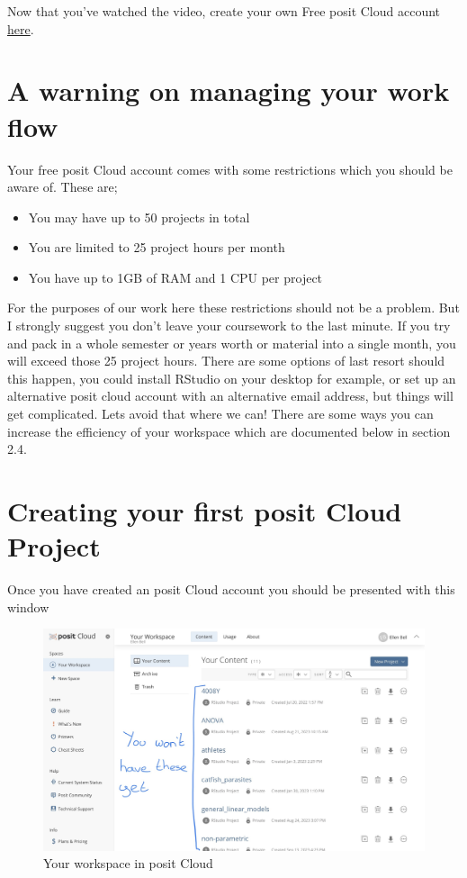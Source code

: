 \documentclass[
]{book}
\providecommand{\tightlist}{%
  \setlength{\itemsep}{0pt}\setlength{\parskip}{0pt}}
\begin{document}
Now that you've watched the video, create your own Free posit Cloud account \href{https://login.rstudio.cloud/login?redirect=\%2Foauth\%2Fauthorize\%3Fredirect_uri\%3Dhttps\%253A\%252F\%252Frstudio.cloud\%252Flogin\%26client_id\%3Drstudio-cloud\%26response_type\%3Dcode\%26show_auth\%3D0\%26show_login\%3D1}{here}.

\hypertarget{a-warning-on-managing-your-work-flow}{%
\section{A warning on managing your work flow}\label{a-warning-on-managing-your-work-flow}}

Your free posit Cloud account comes with some restrictions which you should be aware of. These are;

\begin{itemize}
\tightlist
\item
  You may have up to 50 projects in total
\item
  You are limited to 25 project hours per month
\item
  You have up to 1GB of RAM and 1 CPU per project
\end{itemize}

For the purposes of our work here these restrictions should not be a problem. But I strongly suggest you don't leave your coursework to the last minute. If you try and pack in a whole semester or years worth or material into a single month, you will exceed those 25 project hours. There are some options of last resort should this happen, you could install RStudio on your desktop for example, or set up an alternative posit cloud account with an alternative email address, but things will get complicated. Lets avoid that where we can! There are some ways you can increase the efficiency of your workspace which are documented below in section 2.4.

\hypertarget{creating-your-first-posit-cloud-project}{%
\section{Creating your first posit Cloud Project}\label{creating-your-first-posit-cloud-project}}

Once you have created an posit Cloud account you should be presented with this window

\begin{figure}
\includegraphics[width=0.9\linewidth]{figures/posit1} \caption{Your workspace in posit Cloud}\label{fig:unnamed-chunk-1}
\end{figure}
\end{document}
